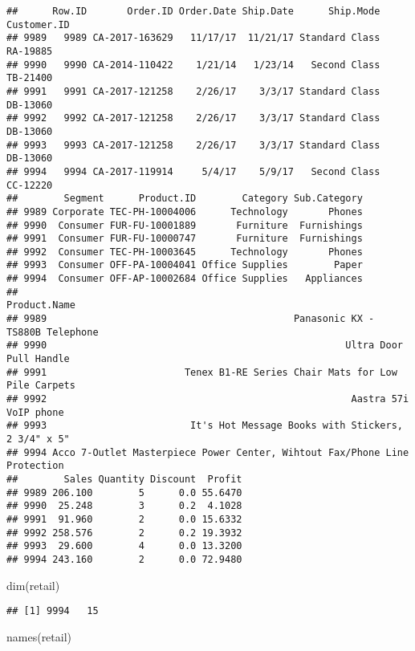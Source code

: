 \documentclass[
]{article}
\newenvironment{Shaded}{\begin{snugshade}}{\end{snugshade}}
\newcommand{\FunctionTok}[1]{\textcolor[rgb]{0.00,0.00,0.00}{#1}}
\newcommand{\NormalTok}[1]{#1}
\begin{document}
\begin{verbatim}
##      Row.ID       Order.ID Order.Date Ship.Date      Ship.Mode Customer.ID
## 9989   9989 CA-2017-163629   11/17/17  11/21/17 Standard Class    RA-19885
## 9990   9990 CA-2014-110422    1/21/14   1/23/14   Second Class    TB-21400
## 9991   9991 CA-2017-121258    2/26/17    3/3/17 Standard Class    DB-13060
## 9992   9992 CA-2017-121258    2/26/17    3/3/17 Standard Class    DB-13060
## 9993   9993 CA-2017-121258    2/26/17    3/3/17 Standard Class    DB-13060
## 9994   9994 CA-2017-119914     5/4/17    5/9/17   Second Class    CC-12220
##        Segment      Product.ID        Category Sub.Category
## 9989 Corporate TEC-PH-10004006      Technology       Phones
## 9990  Consumer FUR-FU-10001889       Furniture  Furnishings
## 9991  Consumer FUR-FU-10000747       Furniture  Furnishings
## 9992  Consumer TEC-PH-10003645      Technology       Phones
## 9993  Consumer OFF-PA-10004041 Office Supplies        Paper
## 9994  Consumer OFF-AP-10002684 Office Supplies   Appliances
##                                                                   Product.Name
## 9989                                           Panasonic KX - TS880B Telephone
## 9990                                                    Ultra Door Pull Handle
## 9991                        Tenex B1-RE Series Chair Mats for Low Pile Carpets
## 9992                                                     Aastra 57i VoIP phone
## 9993                         It's Hot Message Books with Stickers, 2 3/4" x 5"
## 9994 Acco 7-Outlet Masterpiece Power Center, Wihtout Fax/Phone Line Protection
##        Sales Quantity Discount  Profit
## 9989 206.100        5      0.0 55.6470
## 9990  25.248        3      0.2  4.1028
## 9991  91.960        2      0.0 15.6332
## 9992 258.576        2      0.2 19.3932
## 9993  29.600        4      0.0 13.3200
## 9994 243.160        2      0.0 72.9480
\end{verbatim}

\begin{Shaded}
\begin{Highlighting}[]
\FunctionTok{dim}\NormalTok{(retail)}
\end{Highlighting}
\end{Shaded}

\begin{verbatim}
## [1] 9994   15
\end{verbatim}

\begin{Shaded}
\begin{Highlighting}[]
\FunctionTok{names}\NormalTok{(retail)}
\end{Highlighting}
\end{Shaded}
\end{document}
